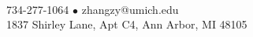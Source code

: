 \begin{center}
    \\
    \vspace{0.5em}
    734-277-1064 $\bullet$ zhangzy@umich.edu\\
    1837 Shirley Lane, Apt C4, Ann Arbor, MI 48105
\end{center}